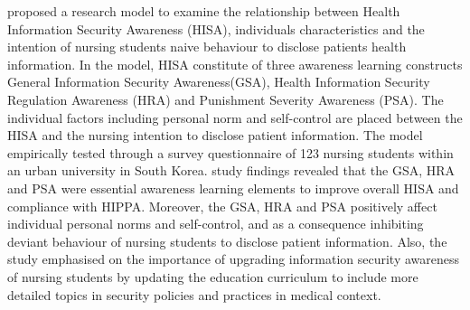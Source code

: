 \citet{Park2017} proposed a research model to examine the relationship between Health Information Security Awareness (HISA), individuals characteristics and the intention of nursing students naive behaviour to disclose patients health information. In the model, HISA constitute of three awareness learning constructs General Information Security Awareness(GSA), Health Information Security Regulation Awareness (HRA) and Punishment Severity Awareness (PSA). The individual factors including personal norm and self-control are placed between the HISA and the nursing intention to disclose patient information. The model empirically tested through a survey questionnaire of 123 nursing students within an urban university in South Korea. \citet{Park2017} study findings revealed that the GSA, HRA and PSA were essential awareness learning elements to improve overall HISA and compliance with HIPPA. Moreover, the GSA, HRA and PSA positively affect individual personal norms and self-control, and as a consequence inhibiting deviant behaviour of nursing students to disclose patient information. Also, the study emphasised on the importance of upgrading information security awareness of nursing students by updating the education curriculum to include more detailed topics in security policies and practices in medical context.




